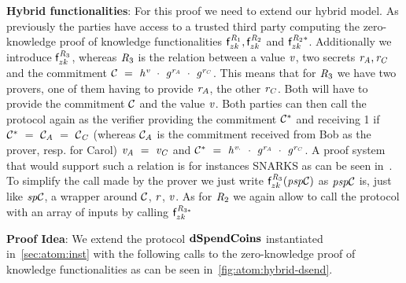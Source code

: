 \textbf{Hybrid functionalities}: For this proof we need to extend our hybrid model.
As previously the parties have access to a trusted third party computing the zero-knowledge proof of knowledge functionalities $\mathsf{f}^{\mathit{R}_1}_{zk}, \mathsf{f}^{\mathit{R}_2}_{zk}$ and $\mathsf{f}^{\mathit{R}_2*}_{zk}$.
Additionally we introduce $\mathsf{f}^{\mathit{R}_3}_{zk}$, whereas $\mathit{R}_3$ is the relation between a value $\mathit{v}$, two secrets $\mathit{r}_{\mathit{A}}, \mathit{r}_{\mathit{C}}$ and the commitment $\mathcal{C} ~=~ \mathit{h}^{\mathit{v}} ~\cdot~ \mathit{g}^{\mathit{r}_{\mathit{A}}} ~\cdot~ \mathit{g}^{\mathit{r}_{\mathit{C}}}$.
This means that for $\mathit{R}_3$ we have two provers, one of them having to provide $\mathit{r}_{\mathit{A}}$, the other $\mathit{r}_{\mathit{C}}$.
Both will have to provide the commitment $\mathcal{C}$ and the value $\mathit{v}$.
Both parties can then call the protocol again as the verifier providing the commitment $\mathcal{C}^*$ and receiving 1 if $\mathcal{C}^* ~=~ \mathcal{C}_{\mathit{A}} ~=~ \mathcal{C}_{\mathit{C}}$ (whereas $\mathcal{C}_{\mathit{A}}$ is the commitment received from Bob as the prover, resp. for Carol) $\mathit{v}_{\mathit{A}} ~=~ \mathit{v}_{\mathit{C}}$ and $\mathcal{C}^* ~=~ \mathit{h}^{\mathit{v}_{\cdot}} ~\cdot~ \mathit{g}^{\mathit{r}_{\mathit{A}}} ~\cdot~ \mathit{g}^{\mathit{r}_{\mathit{C}}}$.
A proof system that would support such a relation is for instances SNARKS as can be seen in~\cite{ben2013snarks}.
To simplify the call made by the prover we just write $\mathsf{f}^{\mathit{R}_3}_{zk}(\mathit{psp}\mathcal{C})$ as $\mathit{psp}\mathcal{C}$ is, just like $\mathit{sp}\mathcal{C}$, a wrapper around $\mathcal{C}$, $\mathit{r}$, $\mathit{v}$.
As for $\mathit{R}_2$ we again allow to call the protocol with an array of inputs by calling $\mathsf{f}^{\mathit{R}_{3*}}_{zk}$

\textbf{Proof Idea}: We extend the protocol $\mathbf{dSpendCoins}$ instantiated in~\cref{sec:atom:inst} with the following calls to the zero-knowledge proof of knowledge functionalities as can be seen in~\cref{fig:atom:hybrid-dsend}.

